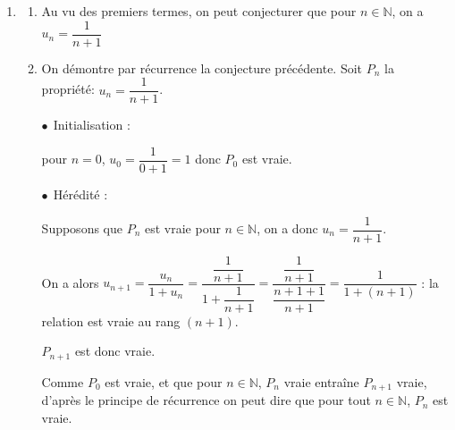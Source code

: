 \documentclass[10pt]{article}
\providecommand{\R}{\mathbb{R}}
\providecommand{\N}{\mathbb{N}}
\begin{document}
\begin{enumerate}
La fonction $f$ est continue, car dérivable sur $\R^+$, donc la limite $\ell$ vérifie  l'égalité $f(\ell) = \ell$.

On résout l'équation: $\dfrac{\ell}{1+\ell}= \ell \iff \ell = \ell(1 + \ell) \iff 0= \ell ^2 \iff \ell = 0$.

Donc la suite $(u_n)$ a pour limite 0.

\item 
	\begin{enumerate}
		\item 
Au vu des premiers termes, on peut conjecturer que pour $n \in \N$, on a $u_n = \dfrac{1}{n+1}$
				
		\item On démontre par récurrence la conjecture précédente.
Soit $P_n$ la propriété: $u_n=\dfrac{1}{n+1}$.
		
$\bullet~~$Initialisation :
		
pour $n=0$, $u_0=\dfrac{1}{0+1}=1$ donc $P_0$ est vraie.

$\bullet~~$Hérédité : 
		
Supposons que $P_n$ est vraie pour $n \in \N$, on a donc $u_n=\dfrac{1}{n+1}$.
		
On a alors $u_{n+1}=\dfrac{u_n}{1+u_n}=\dfrac{\dfrac{1}{n+1}}{1+\dfrac{1}{n+1}}=\dfrac{\dfrac{1}{n+1}}{\dfrac{n+1+1}{n+1}}=\dfrac{1}{1+(n+1)}$ : la relation est vraie au rang $(n + 1)$.

$P_{n+1}$ est donc vraie.
		
Comme $P_0$ est vraie, et que pour $n \in \N$,\: $P_n$ vraie entraîne $P_{n+1}$ vraie, d'après le principe de récurrence  on peut dire que pour tout $n \in \N$, $P_n$ est vraie.
	\end{enumerate}
\end{enumerate}

\vspace{1cm}
\end{document}
